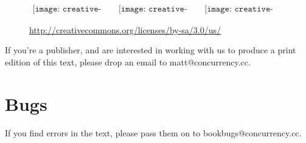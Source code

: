 \ \\

\begin{figure}[ht]
	\begin{center}$
		\begin{array}{ccc}
			\texttt{[image: creative-commons/cc]} &
			\texttt{[image: creative-commons/by]} &
			\texttt{[image: creative-commons/sa]} 
			\end{array}$
		\end{center}
		\captionsetup{labelformat=empty,justification=centering}
		\caption{\small{\url{http://creativecommons.org/licenses/by-sa/3.0/us/}}}
	\end{figure}

If you're a publisher, and are interested in working with us to produce a print edition of this text, please drop an email to {\code matt@concurrency.cc}. 

\section*{Bugs}
If you find errors in the text, please pass them on to {\code bookbugs@concurrency.cc}.
